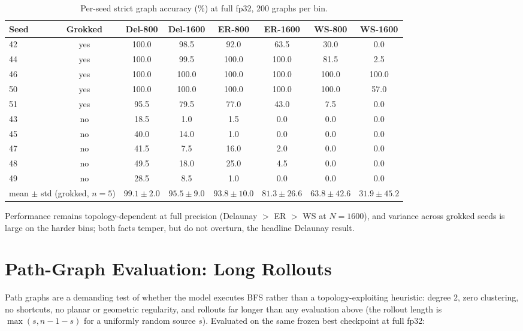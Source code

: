 \documentclass{article}
\begin{document}
\begin{table}[H]
  \caption{Per-seed strict graph accuracy (\%) at full fp32, 200 graphs per bin.}
  \label{per-seed-table}
  \centering
  \begin{tabular}{lccccccc}
    \toprule
    Seed & Grokked & Del-800 & Del-1600 & ER-800 & ER-1600 & WS-800 & WS-1600 \\
    \midrule
    42 & yes & 100.0 & 98.5 & 92.0 & 63.5 & 30.0 & 0.0 \\
    44 & yes & 100.0 & 99.5 & 100.0 & 100.0 & 81.5 & 2.5 \\
    46 & yes & 100.0 & 100.0 & 100.0 & 100.0 & 100.0 & 100.0 \\
    50 & yes & 100.0 & 100.0 & 100.0 & 100.0 & 100.0 & 57.0 \\
    51 & yes & 95.5 & 79.5 & 77.0 & 43.0 & 7.5 & 0.0 \\
    43 & no & 18.5 & 1.0 & 1.5 & 0.0 & 0.0 & 0.0 \\
    45 & no & 40.0 & 14.0 & 1.0 & 0.0 & 0.0 & 0.0 \\
    47 & no & 41.5 & 7.5 & 16.0 & 2.0 & 0.0 & 0.0 \\
    48 & no & 49.5 & 18.0 & 25.0 & 4.5 & 0.0 & 0.0 \\
    49 & no & 28.5 & 8.5 & 1.0 & 0.0 & 0.0 & 0.0 \\
    \midrule
    \multicolumn{2}{l}{mean $\pm$ std (grokked, $n{=}5$)} & $99.1 \pm 2.0$ & $95.5 \pm 9.0$ & $93.8 \pm 10.0$ & $81.3 \pm 26.6$ & $63.8 \pm 42.6$ & $31.9 \pm 45.2$ \\
    \bottomrule
  \end{tabular}
\end{table}

Performance remains topology-dependent at full precision (Delaunay $>$ ER $>$ WS at
$N{=}1600$), and variance across grokked seeds is large on the harder bins; both facts
temper, but do not overturn, the headline Delaunay result.

\section{Path-Graph Evaluation: Long Rollouts}
\label{sec:pathgraphs}

Path graphs are a demanding test of whether the model executes BFS rather than a
topology-exploiting heuristic: degree 2, zero clustering, no shortcuts, no planar or
geometric regularity, and rollouts far longer than any evaluation above (the rollout
length is $\max(s, n{-}1{-}s)$ for a uniformly random source $s$). Evaluated on the same
frozen best checkpoint at full fp32:
\end{document}
